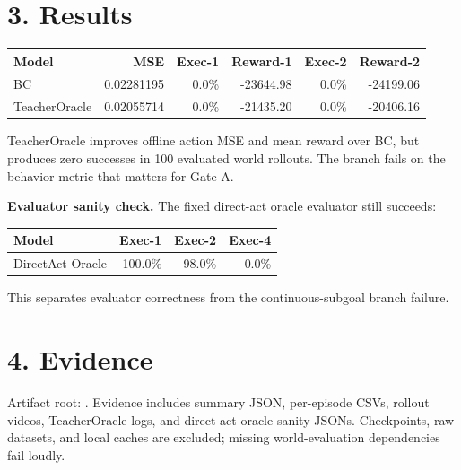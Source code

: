 \documentclass[11pt]{article}
\begin{document}
\section*{3. Results}

\begin{center}
\small
\begin{tabular}{lrrrrr}
\toprule
Model & MSE & Exec-1 & Reward-1 & Exec-2 & Reward-2 \\
\midrule
BC & 0.02281195 & 0.0\% & -23644.98 & 0.0\% & -24199.06 \\
TeacherOracle & 0.02055714 & 0.0\% & -21435.20 & 0.0\% & -20406.16 \\
\bottomrule
\end{tabular}
\normalsize
\end{center}

TeacherOracle improves offline action MSE and mean reward over BC, but produces zero successes in 100 evaluated world rollouts. The branch fails on the behavior metric that matters for Gate A.

\textbf{Evaluator sanity check.}
The fixed direct-act oracle evaluator still succeeds:

\begin{center}
\begin{tabular}{lrrr}
\toprule
Model & Exec-1 & Exec-2 & Exec-4 \\
\midrule
DirectAct Oracle & 100.0\% & 98.0\% & 0.0\% \\
\bottomrule
\end{tabular}
\end{center}

This separates evaluator correctness from the continuous-subgoal branch failure.

\section*{4. Evidence}

Artifact root: . Evidence includes summary JSON, per-episode CSVs, rollout videos, TeacherOracle logs, and direct-act oracle sanity JSONs. Checkpoints, raw datasets, and local caches are excluded; missing world-evaluation dependencies fail loudly.
\end{document}
